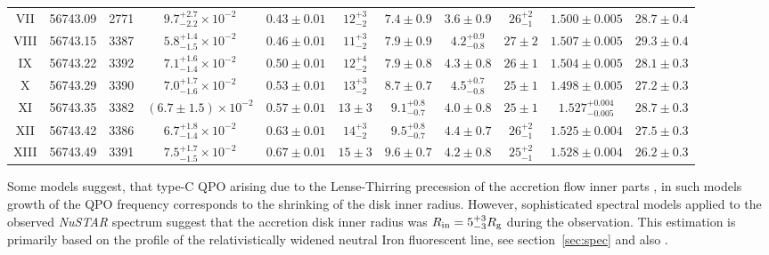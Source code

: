 \documentclass[a4paper,fleqn,usenatbib]{mnras}
\begin{document}
\begin{table}
\begin{tabular}{|c|c|c|c|c|c|c|c|c|c|c|}
VII & 56743.09 & 2771 & $9.7_{-2.2}^{+2.7}\times10^{-2}$ & $0.43\pm0.01$ & $12_{-2}^{+3}$ & $7.4\pm0.9$ & $3.6\pm0.9$ & $26_{-1}^{+2}$ & $1.500\pm0.005$ & $28.7\pm0.4$ \\
VIII & 56743.15 & 3387 & $5.8_{-1.5}^{+1.4}\times10^{-2}$ & $0.46\pm0.01$ & $11_{-2}^{+3}$ & $7.9\pm0.9$ & $4.2_{-0.8}^{+0.9}$ & $27\pm2$ & $1.507\pm0.005$ & $29.3\pm0.4$ \\
IX & 56743.22 & 3392 & $7.1_{-1.4}^{+1.6}\times10^{-2}$ & $0.50\pm0.01$ & $12_{-2}^{+4}$ & $7.9\pm0.8$ & $4.3\pm0.8$ & $26\pm1$ & $1.504\pm0.005$ & $28.1\pm0.3$ \\
X & 56743.29 & 3390 & $7.0_{-1.6}^{+1.7}\times10^{-2}$ & $0.53\pm0.01$ & $13_{-2}^{+3}$ & $8.7\pm0.7$ & $4.5_{-0.8}^{+0.7}$ & $25\pm1$ & $1.498\pm0.005$ & $27.2\pm0.3$ \\
XI & 56743.35 & 3382 & $(6.7\pm1.5)\times10^{-2}$ & $0.57\pm0.01$ & $13\pm3$ & $9.1_{-0.7}^{+0.8}$ & $4.0\pm0.8$ & $25\pm1$ & $1.527_{-0.005}^{+0.004}$ & $28.7\pm0.3$ \\
XII & 56743.42 & 3386 & $6.7_{-1.4}^{+1.8}\times10^{-2}$ & $0.63\pm0.01$ & $14_{-2}^{+3}$ & $9.5_{-0.7}^{+0.8}$ & $4.4\pm0.7$ & $26_{-1}^{+2}$ & $1.525\pm0.004$ & $27.5\pm0.3$ \\
XIII & 56743.49 & 3391 & $7.5_{-1.5}^{+1.7}\times10^{-2}$ & $0.67\pm0.01$ & $15\pm3$ & $9.6\pm0.7$ & $4.2\pm0.8$ & $25_{-1}^{+2}$ & $1.528\pm0.004$ & $26.2\pm0.3$ \\
\hline
\end{tabular}
\end{table}

Some models suggest, that type-C QPO arising due to the Lense-Thirring precession of the accretion flow inner parts \citep{1998ApJ...492L..59S, 2006ApJ...642..420S, 2009MNRAS.397L.101I}, in such models growth of the QPO frequency corresponds to the shrinking of the disk inner radius.
However, sophisticated spectral models applied to the observed {\it NuSTAR} spectrum suggest that the accretion disk inner radius was $R_{\rm in}= 5_{-3}^{+3}R_{\rm g}$ during the observation.
This estimation is primarily based on the profile of the relativistically widened neutral Iron fluorescent line, see section~\ref{sec:spec} and also \citep{miller15_nust}.
\end{document}
